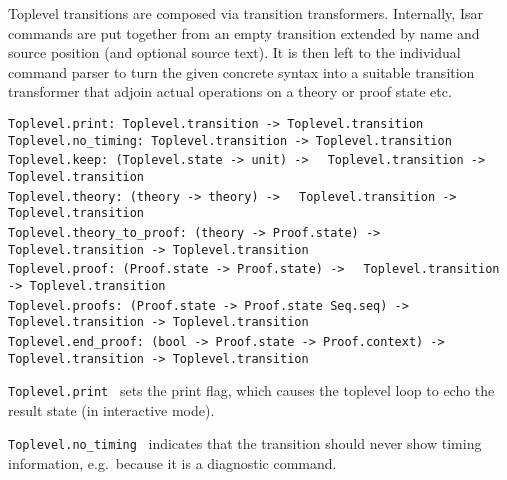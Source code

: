 \begin{isabellebody}
\begin{isamarkuptext}
  Toplevel transitions are composed via transition transformers.
  Internally, Isar commands are put together from an empty transition
  extended by name and source position (and optional source text).  It
  is then left to the individual command parser to turn the given
  concrete syntax into a suitable transition transformer that adjoin
  actual operations on a theory or proof state etc.%
\end{isamarkuptext}%
\isamarkuptrue%
%
\isadelimmlref
%
\endisadelimmlref
%
\isatagmlref
%
\begin{isamarkuptext}%
\begin{mldecls}
  \verb|Toplevel.print: Toplevel.transition -> Toplevel.transition| \\
  \verb|Toplevel.no_timing: Toplevel.transition -> Toplevel.transition| \\
  \verb|Toplevel.keep: (Toplevel.state -> unit) ->|\isasep\isanewline%
\verb|  Toplevel.transition -> Toplevel.transition| \\
  \verb|Toplevel.theory: (theory -> theory) ->|\isasep\isanewline%
\verb|  Toplevel.transition -> Toplevel.transition| \\
  \verb|Toplevel.theory_to_proof: (theory -> Proof.state) ->|\isasep\isanewline%
\verb|  Toplevel.transition -> Toplevel.transition| \\
  \verb|Toplevel.proof: (Proof.state -> Proof.state) ->|\isasep\isanewline%
\verb|  Toplevel.transition -> Toplevel.transition| \\
  \verb|Toplevel.proofs: (Proof.state -> Proof.state Seq.seq) ->|\isasep\isanewline%
\verb|  Toplevel.transition -> Toplevel.transition| \\
  \verb|Toplevel.end_proof: (bool -> Proof.state -> Proof.context) ->|\isasep\isanewline%
\verb|  Toplevel.transition -> Toplevel.transition| \\
  \end{mldecls}

  \begin{description}

  \item \verb|Toplevel.print|~ sets the print flag, which
  causes the toplevel loop to echo the result state (in interactive
  mode).

  \item \verb|Toplevel.no_timing|~ indicates that the
  transition should never show timing information, e.g.\ because it is
  a diagnostic command.


\end{description}
\end{isamarkuptext}
\end{isabellebody}
